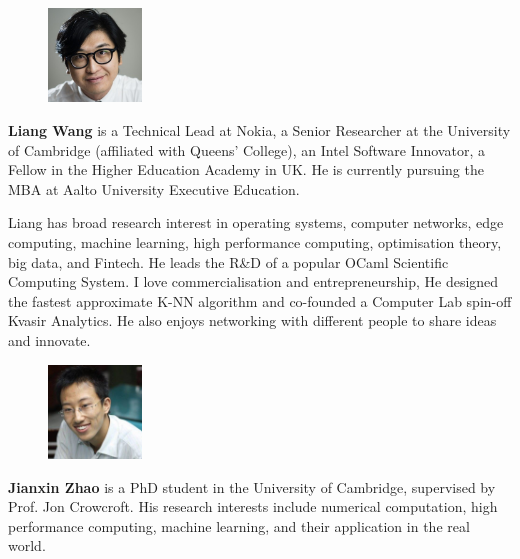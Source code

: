 \begin{figure} 
    \includegraphics[width=25mm,height=25mm,clip,keepaspectratio]{../static/images/asset/liang.jpg}
\end{figure}\par
\textbf{Liang Wang} is a Technical Lead at Nokia, a Senior Researcher at the University of Cambridge (affiliated with Queens' College), an Intel Software Innovator, a Fellow in the Higher Education Academy in UK. He is currently pursuing the MBA at Aalto University Executive Education. 

Liang has broad research interest in operating systems, computer networks, edge computing, machine learning, high performance computing, optimisation theory, big data, and Fintech. He leads the R\&D of a popular OCaml Scientific Computing System. I love commercialisation and entrepreneurship, He designed the fastest approximate K-NN algorithm and co-founded a Computer Lab spin-off Kvasir Analytics. He also enjoys networking with different people to share ideas and innovate.\par

\vspace{3cm}

\begin{figure} 
    \includegraphics[width=25mm,height=25mm,clip,keepaspectratio]{../static/images/asset/jianxin.jpg}
\end{figure}\par
\textbf{Jianxin Zhao} is a PhD student in the University of Cambridge, supervised by Prof. Jon Crowcroft. His research interests include numerical computation, high performance computing, machine learning, and their application in the real world.\par


\clearpage